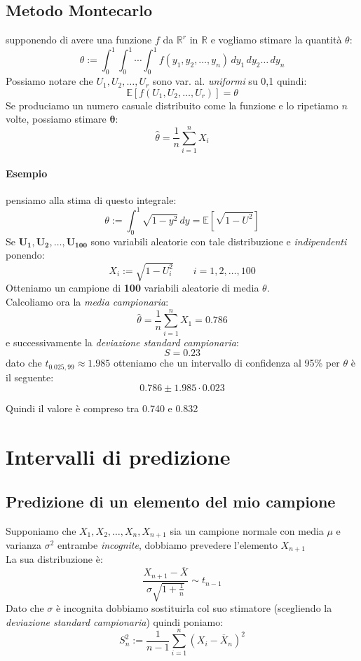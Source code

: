 \documentclass[]{article}
\newcommand{\ev}{\mathbb{E}[X]}
\renewcommand{\ev}[1]{\mathbb{E}\left[#1\right]}
\begin{document}
    \subsection{Metodo Montecarlo}
    supponendo di avere una funzione $f$ da $\mathbb{R}^r$ in $\mathbb{R}$ e vogliamo stimare la quantità $\theta$:
    \[ \theta := \int_{0}^{1} \int_{0}^{1} \cdots \int_{0}^{1} f(y_1, y_2, \ldots, y_n) \, dy_1 \, dy_2 \ldots \, dy_n \]
    Possiamo notare che $U_1, U_2, \ldots, U_r$ sono var. al. \textit{uniformi} su 0,1 quindi:
    \[ \ev{f(U_1, U_2, \ldots, U_r)} = \theta \]
    Se produciamo un numero casuale distribuito come la funzione e lo ripetiamo $n$ volte, possiamo stimare $\boldsymbol{\theta}$:
    \[ \hat{\theta} = \frac{1}{n} \sum_{i = 1}^{n} X_i \]
    \paragraph{Esempio} pensiamo alla stima di questo integrale:
    \[ \theta := \int_{0}^{1} \sqrt{1 - y^2} \, dy = \ev{\sqrt{1-U^2}} \]
    Se $\boldsymbol{U_1, U_2, \ldots, U_{100}}$ sono variabili aleatorie con tale distribuzione e \textit{indipendenti} ponendo:
    \[ X_i := \sqrt{1-U^2_i} \qquad i = 1,2, \ldots, 100 \]
    Otteniamo un campione di \textbf{100} variabili aleatorie di media $\theta$. \\ 
    Calcoliamo ora la \textit{media campionaria}:
    \[ \hat{\theta} = \frac{1}{n} \sum_{i=1}^{n} X_1 = 0.786 \]
    e successivamente la \textit{deviazione standard campionaria}:
    \[ S = 0.23 \]
    dato che $t_{0.025, 99} \approx 1.985$ otteniamo che un intervallo di confidenza al 95\% per $\theta$ è il seguente:
    \[ 0.786 \pm 1.985 \cdot 0.023 \]
    \centerline{Quindi il valore è compreso tra 0.740 e 0.832}
    \newpage
    \section{Intervalli di predizione}
    \subsection{Predizione di un elemento del mio campione}
    Supponiamo che $X_1, X_2, \ldots, X_n, X_{n+1}$ sia un campione normale con media $\mu$ e varianza $\sigma^2$ entrambe \textit{incognite}, dobbiamo prevedere l'elemento $X_{n+1}$ \\
    La sua distribuzione è:
    $$ \frac{X_{n+1}-\overline{X}}{\sigma\sqrt{1+\frac{1}{n}}} \sim t_{n-1} $$
    Dato che $\sigma$ è incognita dobbiamo sostituirla col suo stimatore (scegliendo la \textit{deviazione standard campionaria}) quindi poniamo:
    \[ S^2_n := \frac{1}{n -1} \sum_{i= 1}^{n} (X_i - \overline{X}_n)^2 \]
\end{document}
